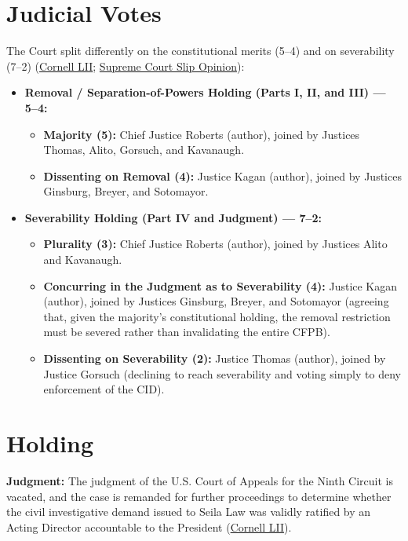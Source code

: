 \documentclass[12pt]{article}
\begin{document}
\section{Judicial Votes}

The Court split differently on the constitutional merits (5--4) and on severability (7--2) (\href{https://www.law.cornell.edu/supremecourt/text/19-7}{Cornell LII}; \href{https://www.supremecourt.gov/opinions/19pdf/19-7_n6io.pdf}{Supreme Court Slip Opinion}):

\begin{itemize}
\item \textbf{Removal / Separation-of-Powers Holding (Parts I, II, and III) --- 5--4:}
\begin{itemize}
\item \textbf{Majority (5):} Chief Justice Roberts (author), joined by Justices Thomas, Alito, Gorsuch, and Kavanaugh.
\item \textbf{Dissenting on Removal (4):} Justice Kagan (author), joined by Justices Ginsburg, Breyer, and Sotomayor.
\end{itemize}
\item \textbf{Severability Holding (Part IV and Judgment) --- 7--2:}
\begin{itemize}
\item \textbf{Plurality (3):} Chief Justice Roberts (author), joined by Justices Alito and Kavanaugh.
\item \textbf{Concurring in the Judgment as to Severability (4):} Justice Kagan (author), joined by Justices Ginsburg, Breyer, and Sotomayor (agreeing that, given the majority's constitutional holding, the removal restriction must be severed rather than invalidating the entire CFPB).
\item \textbf{Dissenting on Severability (2):} Justice Thomas (author), joined by Justice Gorsuch (declining to reach severability and voting simply to deny enforcement of the CID).
\end{itemize}
\end{itemize}

\section{Holding}

\textbf{Judgment:} The judgment of the U.S. Court of Appeals for the Ninth Circuit is vacated, and the case is remanded for further proceedings to determine whether the civil investigative demand issued to Seila Law was validly ratified by an Acting Director accountable to the President (\href{https://www.law.cornell.edu/supremecourt/text/19-7}{Cornell LII}).
\end{document}
